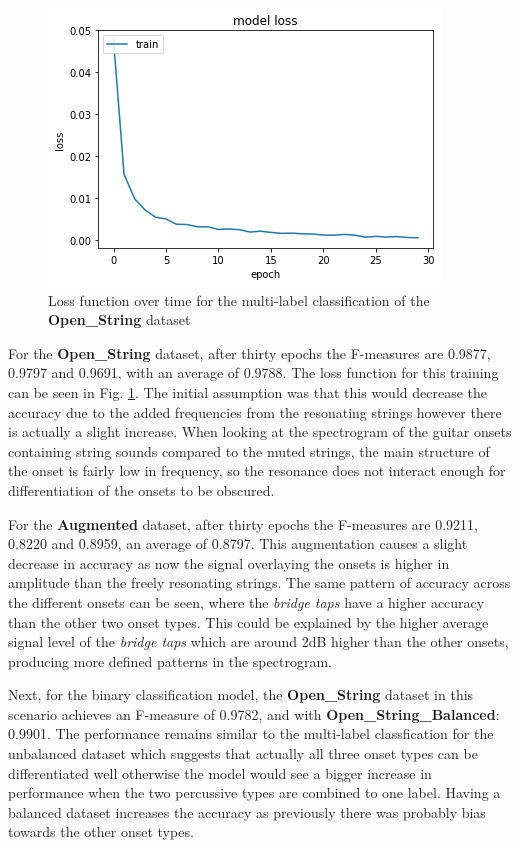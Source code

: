 \documentclass[conference]{IEEEtran}
\begin{document}
\begin{figure}[htbp]
    \centerline{\includegraphics[scale=0.4]{classif-open.png}}
    \caption{Loss function over time for the multi-label classification of the \textbf{Open\_String} dataset}
    \label{classif-open}
    \end{figure}

For the \textbf{Open\_String} dataset, after thirty epochs the F-measures are 0.9877, 0.9797 and 0.9691, with an average of 0.9788. The loss function for this training can be seen in Fig. \ref{classif-open}. The initial assumption was that this would decrease the accuracy
due to the added frequencies from the resonating strings however there is actually a slight increase. When looking at the spectrogram of the guitar onsets containing string sounds compared to the muted strings,
the main structure of the onset is fairly low in frequency, so the resonance does not interact enough for differentiation of the onsets to be obscured. 

For the \textbf{Augmented} dataset, after thirty epochs the F-measures are 0.9211, 0.8220 and 0.8959, an average of 0.8797. This augmentation causes a slight decrease in accuracy as now the signal overlaying the onsets
is higher in amplitude than the freely resonating strings. The same pattern of accuracy across the different onsets can be seen, where the \emph{bridge taps} have a higher accuracy than the other two onset types. This could be
explained by the higher average signal level of the \emph{bridge taps} which are around 2dB higher than the other onsets, producing more defined patterns in the spectrogram.

Next, for the binary classification model, the \textbf{Open\_String} dataset in this scenario achieves an F-measure of 0.9782, and with \textbf{Open\_String\_Balanced}: 0.9901. The performance remains similar to the multi-label classfication for the unbalanced
dataset which suggests that actually all three onset types can be differentiated well otherwise the model would see a bigger increase in performance when the two percussive types are combined to one label. Having a balanced dataset increases
the accuracy as previously there was probably bias towards the other onset types.
\end{document}
